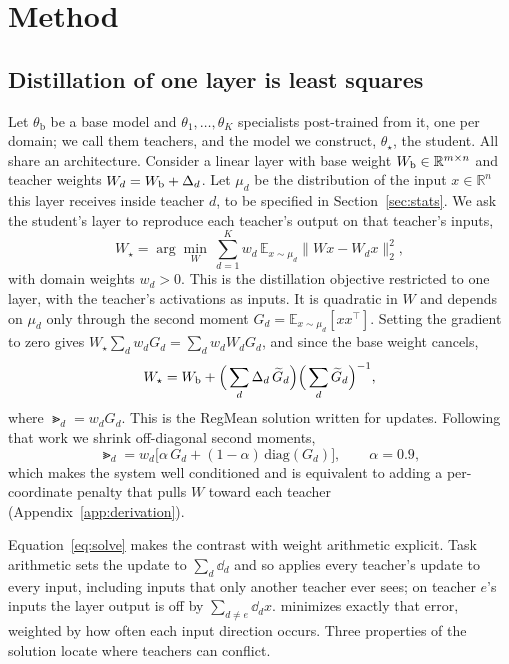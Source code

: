 \section{Method}
\label{sec:method}

\subsection{Distillation of one layer is least squares}
\label{sec:objective}

Let $\theta_{\mathrm{b}}$ be a base model and $\theta_1,\dots,\theta_K$
specialists post-trained from it, one per domain; we call them teachers, and
the model we construct, $\theta_\star$, the student. All share an architecture.
Consider a linear layer with base weight $W_{\mathrm{b}}\in\mathbb{R}^{m\times n}$ and
teacher weights $W_d=W_{\mathrm{b}}+\Delta_d$. Let $\mu_d$ be the distribution of the input
$x\in\mathbb{R}^n$ this layer receives inside teacher $d$, to be specified in
Section~\ref{sec:stats}. We ask the student's layer to reproduce each teacher's
output on that teacher's inputs,
\begin{equation}
W_\star=\arg\min_{W}\ \sum_{d=1}^{K} w_d\,\mathbb{E}_{x\sim\mu_d}\big\|Wx-W_dx\big\|_2^2 ,
\label{eq:obj}
\end{equation}
with domain weights $w_d>0$. This is the distillation objective restricted to
one layer, with the teacher's activations as inputs. It is quadratic in $W$
and depends on $\mu_d$ only through the second moment
$G_d=\mathbb{E}_{x\sim\mu_d}[xx^{\!\top}]$. Setting the gradient to zero gives
$W_\star\sum_d w_dG_d=\sum_d w_dW_dG_d$, and since the base weight cancels,
\begin{equation}
W_\star=W_{\mathrm{b}}+\Big(\sum_{d}\Delta_d\,\widetilde{G}_d\Big)\Big(\sum_{d}\widetilde{G}_d\Big)^{-1},
\label{eq:solve}
\end{equation}
where $\Gt_d=w_dG_d$. This is the RegMean solution \citep{jin2023regmean}
written for updates. Following that work we shrink off-diagonal second moments,
\begin{equation}
\Gt_d=w_d\big[\alpha\,G_d+(1-\alpha)\,\mathrm{diag}(G_d)\big],\qquad \alpha=0.9,
\label{eq:shrink}
\end{equation}
which makes the system well conditioned and is equivalent to adding a
per-coordinate penalty that pulls $W$ toward each teacher
(Appendix~\ref{app:derivation}).

Equation~\eqref{eq:solve} makes the contrast with weight arithmetic explicit.
Task arithmetic sets the update to $\sum_d\dd_d$ and so applies every
teacher's update to every input, including inputs that only another teacher
ever sees; on teacher $e$'s inputs the layer output is off by
$\sum_{d\ne e}\dd_dx$. \method minimizes exactly that error, weighted by how
often each input direction occurs. Three properties of the solution locate
where teachers can conflict.

